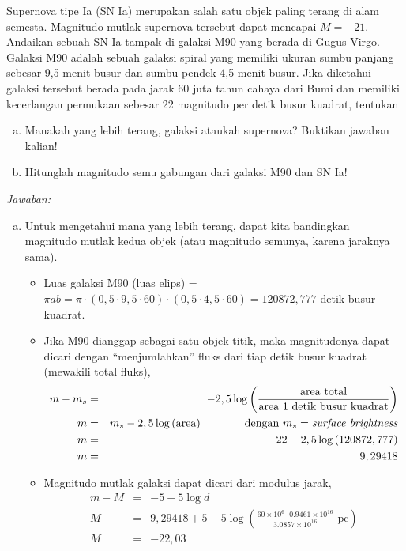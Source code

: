 \documentclass[11pt,fleqn]{exam}
\begin{document}
\begin{questions}
\question Supernova tipe Ia (SN Ia) merupakan salah satu objek paling terang di alam semesta. Magnitudo mutlak supernova tersebut dapat mencapai $M=-21$. Andaikan sebuah SN Ia tampak di galaksi M90 yang berada di Gugus Virgo. Galaksi M90 adalah sebuah galaksi spiral yang memiliki ukuran sumbu panjang sebesar 9,5 menit busur dan sumbu pendek 4,5 menit busur. Jika diketahui galaksi tersebut berada pada jarak 60 juta tahun cahaya dari Bumi dan memiliki kecerlangan permukaan sebesar 22 magnitudo per detik busur kuadrat, tentukan
\begin{enumerate}[(a)]
\item Manakah yang lebih terang, galaksi ataukah supernova? Buktikan jawaban kalian!
\item Hitunglah magnitudo semu gabungan dari galaksi M90 dan SN Ia!
\end{enumerate}

\textit{Jawaban: }

\begin{enumerate}[(a)]
\item Untuk mengetahui mana yang lebih terang, dapat kita bandingkan magnitudo mutlak kedua objek (atau magnitudo semunya, karena jaraknya sama).
\begin{itemize}
\item Luas galaksi M90 (luas elips) = $\pi a b = \pi \cdot (0,5 \cdot 9,5 \cdot 60) \cdot (0,5 \cdot 4,5 \cdot 60) = 120872,777$ detik busur kuadrat.

\item Jika M90 dianggap sebagai satu objek titik, maka magnitudonya dapat dicari dengan ``menjumlahkan'' fluks dari tiap detik busur kuadrat (mewakili total fluks),
\begin{eqnarray*}
m - m_s &=& -2,5 \log{\left(\frac{\text{area total}}{\text{area 1 detik busur kuadrat}}\right)}\\
m &=& m_s - 2,5 \log{\left(\text{area}\right)} \qquad \qquad \text{dengan  } m_s = \text{\textit{surface brightness}}\\
m &=& 22 - 2,5\log{(120872,777)} \\
m &=& 9,29418
\end{eqnarray*}

\item Magnitudo mutlak galaksi dapat dicari dari modulus jarak,
\begin{eqnarray*}
m - M &=& -5 + 5 \log{d}\\
M &=& 9,29418 + 5 - 5\log{\left(\frac{60 \times 10^6 \cdot 0.9461\times 10^{16}}{3.0857 \times 10^{16}} \text{ pc} \right)}\\
M &=& -22,03
\end{eqnarray*}


\end{itemize}
\end{enumerate}
\end{questions}
\end{document}
